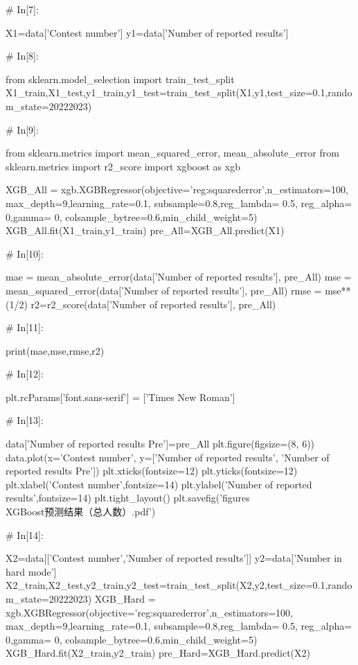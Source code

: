 \documentclass{MathModeling}
\begin{document}
\begin{python}
# In[7]:


X1=data['Contest number']
y1=data['Number of reported results']


# In[8]:


from sklearn.model_selection import train_test_split
X1_train,X1_test,y1_train,y1_test=train_test_split(X1,y1,test_size=0.1,random_state=20222023)


# In[9]:


from sklearn.metrics import mean_squared_error, mean_absolute_error
from sklearn.metrics import r2_score
import xgboost as xgb

XGB_All = xgb.XGBRegressor(objective='reg:squarederror',n_estimators=100,
                           max_depth=9,learning_rate=0.1,
                           subsample=0.8,reg_lambda= 0.5,
                           reg_alpha= 0,gamma= 0,
                           colsample_bytree=0.6,min_child_weight=5)
XGB_All.fit(X1_train,y1_train)
pre_All=XGB_All.predict(X1)


# In[10]:


mae = mean_absolute_error(data['Number of reported results'], pre_All)
mse = mean_squared_error(data['Number of reported results'], pre_All)
rmse = mse**(1/2)
r2=r2_score(data['Number of reported results'], pre_All)


# In[11]:


print(mae,mse,rmse,r2)


# In[12]:


plt.rcParams['font.sans-serif'] = ['Times New Roman']


# In[13]:


data['Number of reported results Pre']=pre_All
plt.figure(figsize=(8, 6))
data.plot(x='Contest number', y=['Number of reported results', 'Number of reported results Pre'])
plt.xticks(fontsize=12)
plt.yticks(fontsize=12)
plt.xlabel('Contest number',fontsize=14)
plt.ylabel('Number of reported results',fontsize=14)
plt.tight_layout()
plt.savefig('figures\\XGBoost预测结果（总人数）.pdf')


# In[14]:


X2=data[['Contest number','Number of reported results']]
y2=data['Number in hard mode']
X2_train,X2_test,y2_train,y2_test=train_test_split(X2,y2,test_size=0.1,random_state=20222023)
XGB_Hard = xgb.XGBRegressor(objective='reg:squarederror',n_estimators=100,
                            max_depth=9,learning_rate=0.1,
                            subsample=0.8,reg_lambda= 0.5,
                            reg_alpha= 0,gamma= 0,
                            colsample_bytree=0.6,min_child_weight=5)
XGB_Hard.fit(X2_train,y2_train)
pre_Hard=XGB_Hard.predict(X2)



\end{python}
\end{document}
